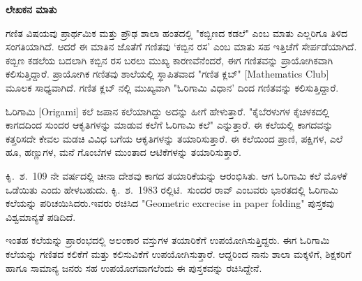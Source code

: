 


\begin{center}
{\LARGE\textbf{{ಲೇಖಕನ ಮಾತು}}}
\end{center}

\noindent
ಗಣಿತ  ವಿಷಯವು ಪ್ರಾರ್ಥಮಿಕ ಮತ್ತು ಪ್ರೌಢ ಶಾಲಾ ಹಂತದಲ್ಲಿ "ಕಬ್ಬಿಣದ ಕಡಲೆ" ಎಂಬ ಮಾತು ಎಲ್ಲರಿಗೂ ತಿಳಿದ ಸಂಗತಿಯಾಗಿದೆ. ಆದರೆ ಈ ಮಾತಿನ ಜೊತೆಗೆ  ಗಣಿತವು `ಕಬ್ಬಿನ ರಸ' ಎಂಬ ಮಾತು ಸಹ ಇತ್ತಿಚೆಗೆ ಸೇರ್ಪಡೆಯಾಗಿದೆ. ಕಬ್ಬಿಣ ಕಡಲೆಯ ಬದಲಾಗಿ ಕಬ್ಬಿನ ರಸ ಬರಲು ಮುಖ್ಯ ಕಾರಣವೆನೆಂದರೆ, ಈಗ ಗಣಿತವನ್ನು ಪ್ರಾಯೋಗಿಕವಾಗಿ ಕಲಿಸುತ್ತಿದ್ದಾರೆ. ಪ್ರಾಯೋಗಿಕ ಗಣಿತವು ಶಾಲೆಯಲ್ಲಿ ಸ್ಥಾಪಿತವಾದ "ಗಣಿತ ಕ್ಲಬ್" [Mathematics Club] ಮೂಲಕ ಸಾಧ್ಯವಾಗಿದೆ. ಗಣಿತ ಕ್ಲಬ್ ನಲ್ಲಿ ಮುಖ್ಯವಾಗಿ "ಓರಿಗಾಮಿ ವಿಧಾನ' ದಿಂದ ಗಣಿತವನ್ನು ಕಲಿಸುತ್ತಿದ್ದಾರೆ. 

\medskip
\noindent
ಓರಿಗಾಮಿ [Origami] ಕಲೆ ಜಪಾನ ಕಲೆಯಾಗಿದ್ದು ಅದನ್ನು ಹೀಗೆ ಹೇಳುತ್ತಾರೆ. "ಕೈ\break ಬೆರಳುಗಳ ಕೈಚಳಕದಲ್ಲಿ ಕಾಗದದಿಂದ ಸುಂದರ ಆಕೃತಿಗಳನ್ನು ಮಾಡುವ ಕಲೆಗೆ ಓರಿಗಾಮಿ ಕಲೆ" ಎನ್ನುತ್ತಾರೆ. ಈ ಕಲೆಯಲ್ಲಿ ಕಾಗದವನ್ನು ಕತ್ತರಿಸದೇ ಕೇವಲ ಮಡಚಿ ವಿವಿಧ ಬಗೆಯ ಆಕೃತಿಗಳನ್ನು ತಯಾರಿಸುತ್ತಾರೆ. ಈ ಕಲೆಯಿಂದ ಪ್ರಾಣಿ, ಪಕ್ಷಿಗಳ, ಎಲೆ ಹೂ, ಹಣ್ಣುಗಳ, ಮನೆ ಗೊಂಬೆಗಳ ಮುಂತಾದ ಆಟಿಕೆಗಳನ್ನು ತಯಾರಿಸುತ್ತಾರೆ. 

\medskip
\noindent
ಕಿೃ.~ಶ.~109 ನೇ ವರ್ಷದಲ್ಲಿ ಚೀನಾ ದೇಶವು ಕಾಗದ ತಯಾರಿಕೆಯನ್ನು ಆರಂಭಿಸಿತು. ಆಗ ಓರಿಗಾಮಿ ಕಲೆ ಮೊಳಕೆ ಒಡೆಯಿತು ಎಂದು ಹೇಳಬಹುದು.  ಕಿೃ.~ಶ.~1983 ರಲ್ಲಿ\break ಟಿ.~ಸುಂದರ ರಾವ್ ಎಂಬವರು ಭಾರತದಲ್ಲಿ ಓರಿಗಾಮಿ ಕಲೆಯನ್ನು ಪರಿಚಯಿಸಿದರು.\break ಇವರು ರಚಿಸಿದ "Geometric excrecise in paper folding" ಪುಸ್ತಕವು ವಿಶ್ವಮಾನ್ಯತೆ ಪಡಿದಿದೆ. 

\medskip
\noindent
ಇಂತಹ ಕಲೆಯನ್ನು ಪ್ರಾರಂಭದಲ್ಲಿ ಅಲಂಕಾರ ವಸ್ತುಗಳ ತಯಾರಿಕೆಗೆ ಉಪಯೋಗಿಸು\break ತ್ತಿದ್ದರು. ಈಗ ಓರಿಗಾಮಿ ಕಲೆಯನ್ನು ಗಣಿತದ ಕಲಿಕೆಗೆ ಮತ್ತು ಕಲಿಸುವಿಕೆಗೆ ಉಪಯೋಗಿಸು\-ತ್ತಾರೆ. ಆದ್ದರಿಂದ ನಾನು ಶಾಲಾ ಮಕ್ಕಳಿಗೆ, ಶಿಕ್ಷಕರಿಗೆ ಹಾಗೂ ಸಾಮಾನ್ಯ ಜನರು ಸಹ ಉಪಯೋಗವಾಗಲೆಂದು ಈ ಪುಸ್ತಕವನ್ನು ರಚಿಸಿದ್ದೇನೆ. 


